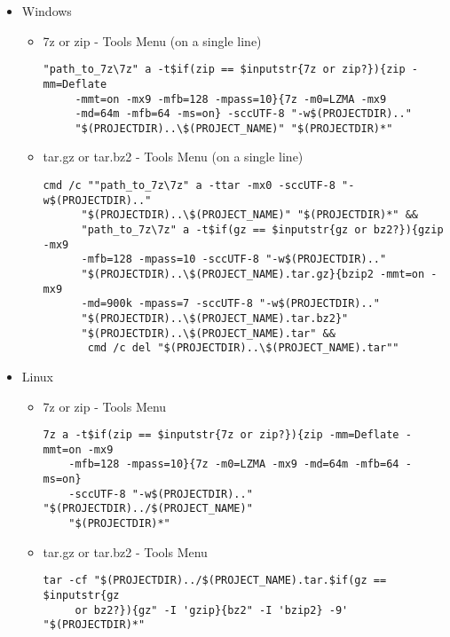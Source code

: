 \begin{itemize}
\item Windows
\begin{itemize}
\item 7z or zip - Tools Menu (on a single line)
\begin{verbatim}
"path_to_7z\7z" a -t$if(zip == $inputstr{7z or zip?}){zip -mm=Deflate
     -mmt=on -mx9 -mfb=128 -mpass=10}{7z -m0=LZMA -mx9 
     -md=64m -mfb=64 -ms=on} -sccUTF-8 "-w$(PROJECTDIR).."
     "$(PROJECTDIR)..\$(PROJECT_NAME)" "$(PROJECTDIR)*"
\end{verbatim}

\item tar.gz or tar.bz2 - Tools Menu (on a single line)
\begin{verbatim}
cmd /c ""path_to_7z\7z" a -ttar -mx0 -sccUTF-8 "-w$(PROJECTDIR).."
      "$(PROJECTDIR)..\$(PROJECT_NAME)" "$(PROJECTDIR)*" && 
      "path_to_7z\7z" a -t$if(gz == $inputstr{gz or bz2?}){gzip -mx9 
      -mfb=128 -mpass=10 -sccUTF-8 "-w$(PROJECTDIR).." 
      "$(PROJECTDIR)..\$(PROJECT_NAME).tar.gz}{bzip2 -mmt=on -mx9 
      -md=900k -mpass=7 -sccUTF-8 "-w$(PROJECTDIR).." 
      "$(PROJECTDIR)..\$(PROJECT_NAME).tar.bz2}"
      "$(PROJECTDIR)..\$(PROJECT_NAME).tar" && 
       cmd /c del "$(PROJECTDIR)..\$(PROJECT_NAME).tar""
\end{verbatim}


\end{itemize}

\item Linux
\begin{itemize}
\item 7z or zip - Tools Menu
\begin{verbatim}
7z a -t$if(zip == $inputstr{7z or zip?}){zip -mm=Deflate -mmt=on -mx9
    -mfb=128 -mpass=10}{7z -m0=LZMA -mx9 -md=64m -mfb=64 -ms=on}
    -sccUTF-8 "-w$(PROJECTDIR).." "$(PROJECTDIR)../$(PROJECT_NAME)"
    "$(PROJECTDIR)*"
\end{verbatim}
\item tar.gz or tar.bz2 - Tools Menu
\begin{verbatim}
tar -cf "$(PROJECTDIR)../$(PROJECT_NAME).tar.$if(gz == $inputstr{gz 
     or bz2?}){gz" -I 'gzip}{bz2" -I 'bzip2} -9' "$(PROJECTDIR)*"
\end{verbatim}
\end{itemize}
\end{itemize}
